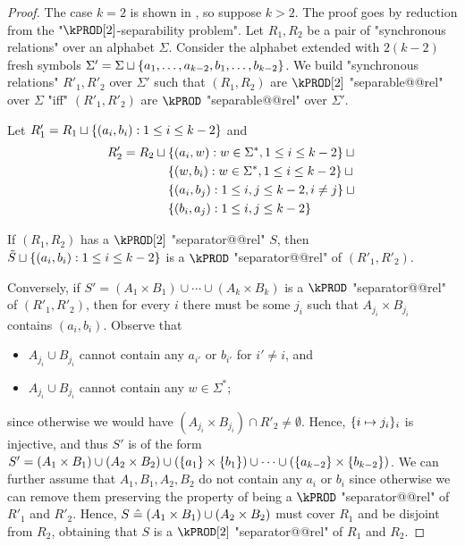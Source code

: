 \begin{proof}
    The case $k=2$ is shown in , so suppose $k>2$.
    The proof goes by reduction from the "$\kPROD[2]$-separability problem". Let $R_1,R_2$ be a pair of "synchronous relations" over an alphabet $\Sigma$. Consider the alphabet extended with $2(k-2)$ fresh symbols $\Sigma' = \Sigma \sqcup \{a_1, \dotsc, a_{k-2}, b_1, \dotsc, b_{k-2}\}$. We build "synchronous relations" $R'_1,R'_2$ over $\Sigma'$ such that $(R_1,R_2)$ are $\kPROD[2]$ "separable@@rel" over $\Sigma$ "iff" $(R'_1,R'_2)$ are $\kPROD$ "separable@@rel" over $\Sigma'$.

    Let $R'_1 = R_1 \sqcup \{ (a_i,b_i) : 1 \leq i \leq k-2\}$ and 
    \begin{align*}
    R'_2 =  R_2 \sqcup {}&\{(a_i,w) : w \in \Sigma^*, 1 \leq i \leq k-2\} \sqcup {}\\
                    &\{(w,b_i) : w \in \Sigma^*, 1 \leq i \leq k-2\} \sqcup {}\\
                    &\{(a_i,b_j) : 1 \leq i,j \leq k-2, i \neq j\} \sqcup {}\\
                    &\{(b_i,a_j) : 1 \leq i,j \leq k-2\}
    \end{align*}
    
    If $(R_1,R_2)$ has a $\kPROD[2]$ "separator@@rel" $S$, then $\tilde S \sqcup \{(a_i,b_i) : 1 \leq i \leq k-2\}$ is a $\kPROD$ "separator@@rel" of $(R'_1,R'_2)$.
    

    Conversely, if $S' = (A_1 \times B_1) \cup \dotsb \cup (A_k \times B_k)$ is a $\kPROD$ "separator@@rel" of $(R'_1,R'_2)$, then for every $i$ there must be some $j_i$ such that $A_{j_i} \times B_{j_i}$ contains $(a_i,b_i)$. Observe that 
    \begin{itemize}
        \item $A_{j_i} \cup B_{j_i}$ cannot contain any $a_{i'}$ or $b_{i'}$ for $i' \neq i$, and
        \item $A_{j_i} \cup B_{j_i}$ cannot contain any $w \in \Sigma^*$;
    \end{itemize}
    since otherwise we would have $(A_{j_i} \times B_{j_i}) \cap R'_2 \neq \emptyset$.
    Hence, $\{i \mapsto j_i\}_i$ is injective, and thus $S'$ is of the form $S' = (A_1 \times B_1) \cup (A_2 \times B_2)  \cup (\{a_1\} \times \{b_1\}) \cup \dotsb \cup (\{a_{k-2}\} \times \{b_{k-2}\})$. We can further assume that $A_1,B_1,A_2,B_2$ do not contain any $a_i$ or $b_i$ since otherwise we can remove them preserving the property of being a $\kPROD$ "separator@@rel" of $R'_1$ and $R'_2$.
    Hence, $S \mathrel{\hat{=}} (A_1 \times B_1) \cup (A_2 \times B_2)$ must cover $R_1$ and be disjoint from $R_2$, obtaining that $S$ is a $\kPROD[2]$ "separator@@rel" of $R_1$ and $R_2$.
\end{proof}


